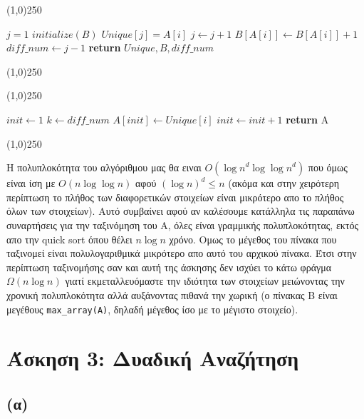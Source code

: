 \documentclass[a4paper,12pt]{report}
\begin{document}
\begin{center}
\line(1,0){250} 
\begin{algorithmic}[1]
  \State $j=1$
  \State $initialize(B)$	
      \State $Unique[j]=A[i]$	
      \State $j \gets j+1$
    \EndIf
    \State $B[A[i]] \gets B[A[i]]+1$
  \EndFor
  \State $diff\_num \gets j-1$
  \State \textbf{return} $Unique,B,diff\_num$ 
\EndProcedure
\end{algorithmic}
\line(1,0){250} 
\end{center}
\begin{center}
\line(1,0){250} 
\begin{algorithmic}[1]
  \State $init \gets 1$
  \State $k \gets diff\_num$
      \State $A[init] \gets Unique[i]$
      \State $init \gets init+1$
    \EndFor
  \EndFor
  \State \textbf{return} A 
\EndProcedure
\end{algorithmic}
\line(1,0){250} 
\end{center}
Η πολυπλοκότητα του αλγόριθμου μας θα ειναι $O({\log n}^d \log {\log n}^d)$ που όμως είναι ίση με $O(n\log \log n)$ αφού $(\log n)^d \leq n$ (ακόμα και στην χειρότερη περίπτωση το πλήθος των διαφορετικών στοιχείων είναι μικρότερο απο το πλήθος όλων των στοιχείων). Αυτό συμβαίνει αφού αν καλέσουμε κατάλληλα τις παραπάνω συναρτήσεις για την ταξινόμηση του Α, όλες είναι γραμμικής πολυπλοκότητας, εκτός απο την quick sort όπου θέλει $n \log n$ χρόνο. Ομως το μέγεθος του πίνακα που ταξινομεί 
είναι πολυλογαριθμικά μικρότερο απο αυτό του αρχικού πίνακα. Έτσι στην περίπτωση ταξινομήσης σαν και αυτή της άσκησης δεν ισχύει το κάτω φράγμα $\Omega (n \log n)$ γιατί εκμεταλλευόμαστε την ιδιότητα των στοιχείων μειώνοντας την χρονική πολυπλοκότητα αλλά αυξάνοντας πιθανά την χωρική (ο πίνακας Β είναι μεγέθους \texttt{max\_array(A)}, δηλαδή μέγεθος ίσο με το μέγιστο στοιχείο).

\section*{Άσκηση 3: Δυαδική Αναζήτηση}
\subsection*{(α)}
\end{document}
